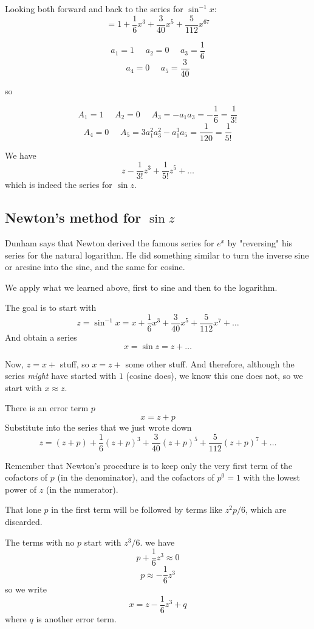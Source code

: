 \documentclass[11pt, oneside]{article}
\begin{document}
Looking both forward and back to the series for $\sin^{-1} x$:
\[ = 1 + \frac{1}{6}x^3 + \frac{3}{40} x^5 + \frac{5}{112} x^67 \]

\[ a_1 = 1 \ \ \ \ \ \ a_2 = 0 \ \ \ \ \ \ a_3 =  \frac{1}{6} \]
\[ a_4 =  0  \ \ \ \ \ \ a_5 =  \frac{3}{40} \]

so 

\[ A_1 = 1 \ \ \ \ \ \ A_2 = 0 \ \ \ \ \ \ A_3 = -a_1 a_3 =  -\frac{1}{6} = \frac{1}{3!} \]
\[ A_4 = 0 \ \ \ \ \ \ A_5 = 3 a_1^2 a_3^2 - a_1^3 a_5 =  \frac{1}{120} = \frac{1}{5!}  \]

We have
\[ z - \frac{1}{3!} z^3 + \frac{1}{5!} z^5 + \dots \]
which is indeed the series for $\sin z$.

\subsection*{Newton's method for $\sin z$}

Dunham says that Newton derived the famous series for $e^x$ by "reversing" his series for the natural logarithm.  He did something similar to turn the inverse sine or arcsine into the sine, and the same for cosine.

We apply what we learned above, first to sine and then to the logarithm.

The goal is to start with
\[ z = \sin^{-1} x = x + \frac{1}{6}x^3 + \frac{3}{40}x^5 + \frac{5}{112}x^7 + \dots \]
And obtain a series
\[ x = \sin z = z + \dots \]

Now, $z = x + $ stuff, so $x = z +$ some other stuff.  And therefore, although the series \emph{might} have started with $1$ (cosine does), we know this one does not, so we start with $x \approx z$.  

There is an error term $p$
\[ x = z + p \]
Substitute into the series that we just wrote down
\[ z  = (z + p) +  \frac{1}{6}(z + p)^3 + \frac{3}{40}(z + p)^5 + \frac{5}{112}(z + p)^7 + \dots   \]

Remember that Newton's procedure is to keep only the very first term of the cofactors of $p$ (in the denominator), and the cofactors of $p^0 = 1$ with the lowest power of $z$ (in the numerator).  

That lone $p$ in the first term will be followed by terms like $z^2p/6$, which are discarded.

The terms with no $p$ start with $z^3/6$.  we have
\[ p + \frac{1}{6}z^3 \approx 0 \]
\[ p \approx - \frac{1}{6}z^3 \]
so we write
\[ x = z - \frac{1}{6}z^3 + q \]
where $q$ is another error term.
\end{document}
